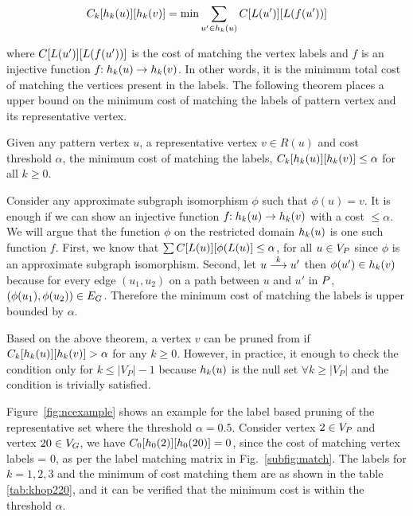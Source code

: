  \begin{equation}
  \khopcost{k}{u}{v} = \text{min}\displaystyle\sum_{u' \in \khopl{k}{u}} \matij{C}{L(u')}{L(f(u'))}
 \end{equation}

where 
$\matij{C}{L(u')}{L(f(u'))}$ is the cost of matching the vertex labels and
$f$ is an injective function $f\!\!:\khopl{k}{u} \rightarrow \khopl{k}{v}$.
In other words,
it is the minimum total cost of matching the vertices present in the \khop labels.
The following theorem places a upper bound on the minimum cost of matching
the \khop labels of pattern vertex and its representative vertex.

\begin{thm}
Given any pattern vertex $u$, a representative vertex $v \in R(u)$ and cost
threshold $\alpha$, the minimum cost of matching the \khop labels, 
$\khopcost{k}{u}{v} \leq \alpha$ for all $k \geq 0$.

\begin{myproof}
Consider any approximate subgraph isomorphism $\phi$
such that $\phi(u) = v$. It is enough if we can show an injective function
$f\!\!:\khopl{k}{u} \rightarrow \khopl{k}{v}$ with a cost
$\leq \alpha$. We will argue that the function $\phi$ on the restricted domain
$\khopl{k}{u}$ is one such function $f$.
First, we know that 
$\sum\matij{C}{L(u)}{\phi(L(u)} \leq \alpha$, for all $u \in \vp$ since
$\phi$ is an approximate subgraph isomorphism. Second, let 
$\kpath{u}{u'}{k}$
then $\phi(u') \in \khopl{k}{v}$ because for every edge $(u_1, u_2)$ on a 
path between $u$ and $u'$ in $\pat$, $(\phi(u_1),\phi(u_2)) \in \eg$. 
Therefore the minimum cost of matching the \khop labels is upper bounded
by $\alpha$.
\end{myproof}
\label{thm:khop}
\end{thm}

Based on the above theorem, a vertex $v$ can be pruned from 
\CR if $\khopcost{k}{u}{v} > \alpha$ for any 
$k \geq 0$. However, in practice, it enough to check the condition only
for $k \leq |V_P|-1$ because $\khopl{k}{u}$ is the null set $\forall k \geq
|V_P|$ and the condition is trivially satisfied.

Figure~\ref{fig:ncexample} shows an example for the \khop label based
pruning of the representative set where the
threshold $\alpha = 0.5$. Consider vertex $2 \in \vp$ and vertex
$20 \in \vg$, we have 
$\khopcost{0}{2}{20} = 0$, since the cost of matching vertex labels 
 = 0, 
as per the label matching matrix
 in Fig.~\ref{subfig:match}. The \khop labels for $k=1,2,3$ and 
the minimum of cost matching them are
as shown in the table \ref{tab:khop220}, and it can be verified that
the minimum cost is within the threshold $\alpha$.

